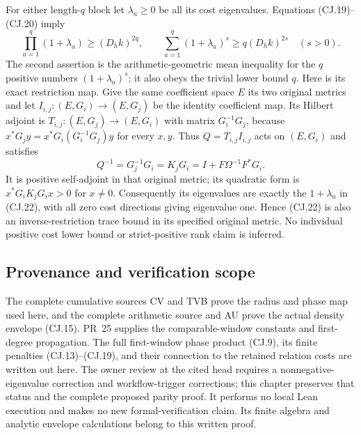 For either length-$q$ block let $\lambda_a\ge0$ be all its cost
eigenvalues. Equations (CJ.19)--(CJ.20) imply
\[
 \prod_{a=1}^q(1+\lambda_a)\ge(D_hk)^{2q},\qquad
 \sum_{a=1}^q(1+\lambda_a)^s\ge q(D_hk)^{2s}
 \quad(s>0).
 \tag{CJ.22}
\]
The second assertion is the arithmetic-geometric mean inequality
for the $q$ positive numbers $(1+\lambda_a)^s$; it also obeys
the trivial lower bound $q$. Here is its exact restriction map.
Give the same coefficient space $E$ its two original metrics and
let $I_{i,j}:(E,G_i)\to(E,G_j)$ be the identity coefficient map.
Its Hilbert adjoint is
$T_{i,j}:(E,G_j)\to(E,G_i)$ with matrix $G_i^{-1}G_j$,
because $x^*G_jy=x^*G_i(G_i^{-1}G_j)y$ for every $x,y$.
Thus $Q=T_{i,j}I_{i,j}$ acts on $(E,G_i)$ and satisfies
\[
 Q^{-1}=G_j^{-1}G_i=K_jG_i
      =I+F\Omega^{-1}F^*G_i.
\]
It is positive self-adjoint in that original metric; its
quadratic form is $x^*G_iK_jG_ix>0$ for $x\ne0$.
Consequently its eigenvalues are exactly the $1+\lambda_a$
in (CJ.22), with all zero cost directions giving eigenvalue one.
Hence (CJ.22) is also an inverse-restriction trace
bound in its specified original metric. No individual positive
cost lower bound or strict-positive rank claim is inferred.

\subsection{Provenance and verification scope}

The complete cumulative sources CV and TVB prove the radius and
phase map used here, and the complete arithmetic source and AU
prove the actual density envelope (CJ.15). PR~25 supplies the
comparable-window constants and first-degree propagation. The
full first-window phase product (CJ.9), its finite penalties
(CJ.13)--(CJ.19), and their connection to the retained relation
costs are written out here. The owner review at the cited head
requires a nonnegative-eigenvalue correction and workflow-trigger
corrections; this chapter preserves that status and the complete
proposed parity proof. It performs no local Lean execution and
makes no new formal-verification claim. Its finite algebra and
analytic envelope calculations belong to this written proof.

\endgroup
